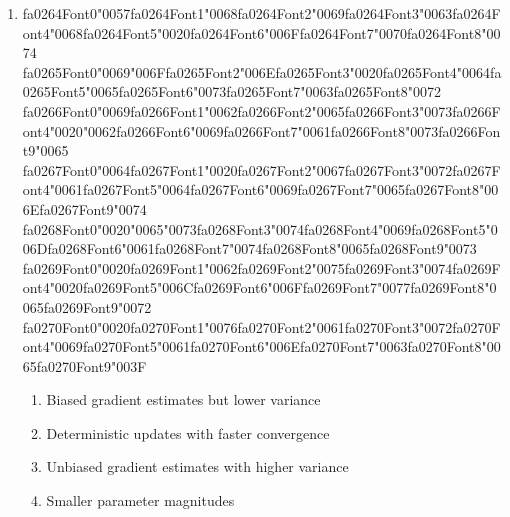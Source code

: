 \documentclass[12pt]{article}
\begin{document}
\begin{enumerate}[label=Q\arabic*.]
 \item {\csname fa0264Font0\endcsname\char"0057}{\csname fa0264Font1\endcsname\char"0068}{\csname fa0264Font2\endcsname\char"0069}{\csname fa0264Font3\endcsname\char"0063}{\csname fa0264Font4\endcsname\char"0068}{\csname fa0264Font5\endcsname\char"0020}{\csname fa0264Font6\endcsname\char"006F}{\csname fa0264Font7\endcsname\char"0070}{\csname fa0264Font8\endcsname\char"0074} {\csname fa0265Font0\endcsname\char"0069}{\char"006F}{\csname fa0265Font2\endcsname\char"006E}{\csname fa0265Font3\endcsname\char"0020}{\csname fa0265Font4\endcsname\char"0064}{\csname fa0265Font5\endcsname\char"0065}{\csname fa0265Font6\endcsname\char"0073}{\csname fa0265Font7\endcsname\char"0063}{\csname fa0265Font8\endcsname\char"0072} {\csname fa0266Font0\endcsname\char"0069}{\csname fa0266Font1\endcsname\char"0062}{\csname fa0266Font2\endcsname\char"0065}{\csname fa0266Font3\endcsname\char"0073}{\csname fa0266Font4\endcsname\char"0020}{\char"0062}{\csname fa0266Font6\endcsname\char"0069}{\csname fa0266Font7\endcsname\char"0061}{\csname fa0266Font8\endcsname\char"0073}{\csname fa0266Font9\endcsname\char"0065} {\csname fa0267Font0\endcsname\char"0064}{\csname fa0267Font1\endcsname\char"0020}{\csname fa0267Font2\endcsname\char"0067}{\csname fa0267Font3\endcsname\char"0072}{\csname fa0267Font4\endcsname\char"0061}{\csname fa0267Font5\endcsname\char"0064}{\csname fa0267Font6\endcsname\char"0069}{\csname fa0267Font7\endcsname\char"0065}{\csname fa0267Font8\endcsname\char"006E}{\csname fa0267Font9\endcsname\char"0074} {\csname fa0268Font0\endcsname\char"0020}{\char"0065}{\char"0073}{\csname fa0268Font3\endcsname\char"0074}{\csname fa0268Font4\endcsname\char"0069}{\csname fa0268Font5\endcsname\char"006D}{\csname fa0268Font6\endcsname\char"0061}{\csname fa0268Font7\endcsname\char"0074}{\csname fa0268Font8\endcsname\char"0065}{\csname fa0268Font9\endcsname\char"0073} {\csname fa0269Font0\endcsname\char"0020}{\csname fa0269Font1\endcsname\char"0062}{\csname fa0269Font2\endcsname\char"0075}{\csname fa0269Font3\endcsname\char"0074}{\csname fa0269Font4\endcsname\char"0020}{\csname fa0269Font5\endcsname\char"006C}{\csname fa0269Font6\endcsname\char"006F}{\csname fa0269Font7\endcsname\char"0077}{\csname fa0269Font8\endcsname\char"0065}{\csname fa0269Font9\endcsname\char"0072} {\csname fa0270Font0\endcsname\char"0020}{\csname fa0270Font1\endcsname\char"0076}{\csname fa0270Font2\endcsname\char"0061}{\csname fa0270Font3\endcsname\char"0072}{\csname fa0270Font4\endcsname\char"0069}{\csname fa0270Font5\endcsname\char"0061}{\csname fa0270Font6\endcsname\char"006E}{\csname fa0270Font7\endcsname\char"0063}{\csname fa0270Font8\endcsname\char"0065}{\csname fa0270Font9\endcsname\char"003F}
 \begin{enumerate}[label=(\Alph*)]
     \item Biased gradient estimates but lower variance
     \item Deterministic updates with faster convergence
     \item Unbiased gradient estimates with higher variance
     \item Smaller parameter magnitudes
 \end{enumerate}
 

\end{enumerate}
\end{document}
